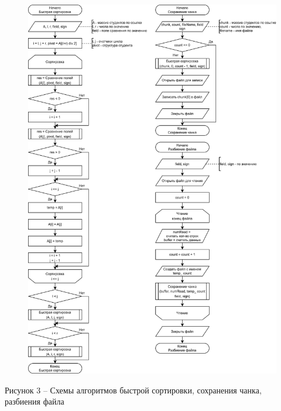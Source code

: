 \documentclass[a4paper,14pt]{extarticle}
\begin{document}
  \begin{figure}[h]
    \centering
    \includegraphics[width=0.79\linewidth]{images/s-3}
  \end{figure}
  \begin{center}
    Рисунок 3 – Схемы алгоритмов быстрой сортировки, сохранения чанка, разбиения файла
  \end{center}

  \pagebreak
\end{document}
